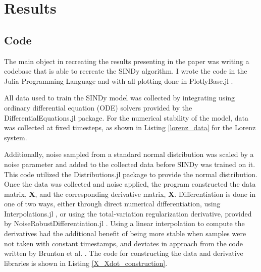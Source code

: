 \documentclass[10pt]{paper}
\begin{document}
\section{Results}
\subsection{Code}
The main object in recreating the results presenting in the paper was writing a codebase that is able to recreate the SINDy algorithm. 
I wrote the code in the Julia Programming Language \cite{julia} and with all plotting done in PlotlyBase.jl \cite{PlotlyBase.jl}.

All data used to train the SINDy model was collected by integrating using ordinary differential equation (ODE) solvers provided by the DifferentialEquations.jl \cite{rackauckas2017differentialequations} package.
For the numerical stability of the model, data was collected at fixed timesteps, as shown in Listing \ref{lorenz_data} for the Lorenz system.


Additionally, noise sampled from a standard normal distribution was scaled by a noise parameter and added to the collected data before SINDy was trained on it. This code utilized the Distributions.jl \cite{JSSv098i16}\cite{Distributions.jl-2019} package to provide the normal distribution. 
Once the data was collected and noise applied, the program constructed the data matrix, $\mathbf X$, and the corresponding derivative matrix, $\mathbf {\dot X}$. Differentiation is done in one of two ways, either through direct numerical differentiation, using Interpolations.jl \cite{Interpolations.jl}, or using the total-variation regularization derivative, provided by NoiseRobustDifferentiation.jl \cite{chartrand2011numerical}\cite{NoiseRobustDifferentiation.jl}.
Using a linear interpolation to compute the derivatives had the additional benefit of being more stable when samples were not taken with constant timestamps, and deviates in approach from the code written by Brunton et al. \cite{sindy}. 
The code for constructing the data and derivative libraries is shown in Listing \ref{X_Xdot_construction}. 

\end{document}
